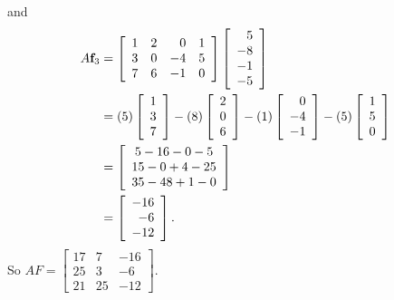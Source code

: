 \begin{example}
and
\begin{align*}
A\mathbf{f}_3 &= \left[ \begin{array}{ccrc} 1&2&0&1\\3&0&-4&5\\7&6&-1&0 \end{array} \right] \left[ \begin{array}{r} 5\\-8\\-1\\-5 \end{array} \right] \\
	&= (5) \left[ \begin{array}{c} 1\\3\\7 \end{array} \right]  - (8)  \left[ \begin{array}{c} 2\\0\\6 \end{array} \right]  - (1)  \left[ \begin{array}{r} 0\\-4\\-1 \end{array} \right] - (5)  \left[ \begin{array}{c} 1\\5\\0 \end{array} \right] \\
	&=  \left[ \begin{array}{c} 5-16-0-5 \\ 15-0+4-25 \\ 35-48+1-0\end{array} \right] \\
	&=  \left[ \begin{array}{r} -16\\-6\\-12 \end{array} \right].
\end{align*}
So $AF = \left[ \begin{array}{ccr} 17&7&-16\\25&3&-6\\21&25&-12 \end{array} \right]$. 


\end{example}
